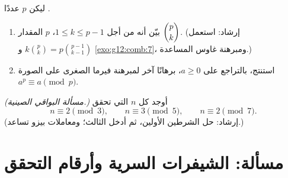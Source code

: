 \begin{exercise}[$\star\star\star$]\label{exo:g12:arith:9}
ليكن $p$ عددًا .
\begin{enumerate}
  \item بيّن أنه من أجل $1 \leq k \leq p - 1$،  $p$ المقدار $\dbinom{p}{k}$.
        (إرشاد: استعمل $k\binom pk = p\binom{p-1}{k-1}$ و \cref{exo:g12:comb:7}،
        ومبرهنة غاوس المساعدة.)
  \item استنتج، بالتراجع على $a \geq 0$، برهانًا آخر لمبرهنة فيرما
        الصغرى على الصورة $a^p \equiv a \pmod p$.
\end{enumerate}
\end{exercise}

\begin{exercise}[$\star\star\star$]\label{exo:g12:arith:10}
\emph{(مسألة البواقي الصينية.)} أوجد كل  $n$ التي تحقق
\[
n \equiv 2 \pmod 3, \qquad n \equiv 3 \pmod 5, \qquad n \equiv 2 \pmod 7 .
\]
(إرشاد: حل الشرطين الأولين، ثم أدخل الثالث؛ ومعاملات بيزو
تساعد.)
\end{exercise}

\section{مسألة: الشيفرات السرية وأرقام التحقق}

